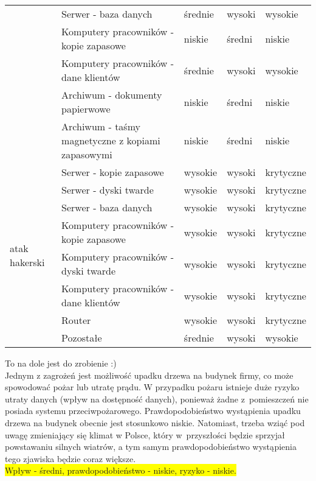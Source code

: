 \begin{landscape}
\begin{longtable}[!ht]{|m{4cm}|m{6cm}|m{4.5cm}|m{3cm}|m{3cm}|}
		& Serwer - baza danych                              & średnie            & wysoki & wysokie       \\ \cline{2-5} 
		& Komputery pracowników - kopie zapasowe            & niskie             & średni & niskie        \\ \cline{2-5} 
		& Komputery pracowników - dane klientów             & średnie            & wysoki & wysokie       \\ \cline{2-5} 
		& Archiwum - dokumenty papierwowe                   & niskie             & średni & niskie        \\ \cline{2-5} 
		& Archiwum - taśmy magnetyczne z kopiami zapasowymi & niskie             & średni & niskie        \\ \hline
		\multirow{8}{4cm}{atak hakerski}                                                                        & Serwer - kopie zapasowe                           & wysokie            & wysoki & krytyczne     \\ \cline{2-5} 
		& Serwer - dyski twarde                             & wysokie            & wysoki & krytyczne     \\ \cline{2-5} 
		& Serwer - baza danych                              & wysokie            & wysoki & krytyczne     \\ \cline{2-5} 
		& Komputery pracowników - kopie zapasowe            & wysokie            & wysoki & krytyczne     \\ \cline{2-5} 
		& Komputery pracowników - dyski twarde              & wysokie            & wysoki & krytyczne     \\ \cline{2-5} 
		& Komputery pracowników - dane klientów             & wysokie            & wysoki & krytyczne     \\ \cline{2-5} 
		& Router                                            & wysokie            & wysoki & krytyczne     \\ \cline{2-5} 
		& Pozostałe                                         & średnie            & wysoki & wysokie       \\ \hline
\end{longtable}
\end{landscape}

To na dole jest do zrobienie :)  \\
Jednym z zagrożeń jest możliwość upadku drzewa na budynek firmy, co może spowodować pożar lub utratę prądu. W przypadku pożaru istnieje duże ryzyko utraty danych (wpływ na dostępność danych), ponieważ żadne z~pomieszczeń nie posiada systemu przeciwpożarowego.  Prawdopodobieństwo wystąpienia upadku drzewa na budynek obecnie jest stosunkowo niskie. Natomiast, trzeba wziąć pod uwagę zmieniający się klimat w Polsce, który w~przyszłości będzie sprzyjał powstawaniu silnych wiatrów, a tym samym prawdopodobieństwo wystąpienia tego zjawiska będzie coraz większe. \\ \colorbox{yellow}{Wpływ - średni, prawdopodobieństwo - niskie, ryzyko - niskie.}

